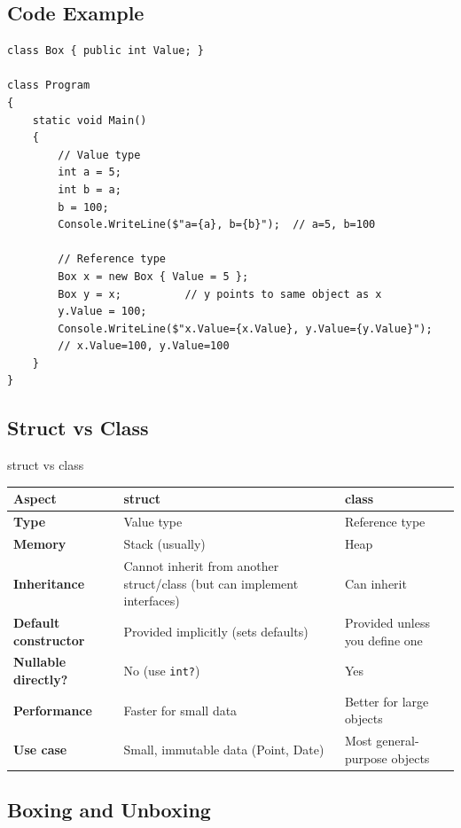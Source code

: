 \documentclass[11pt,a4paper]{article}
\newcommand{\rowcolortop}{\rowcolor{tableHead}\color{white}\bfseries}
\newcommand{\rowcolorlight}{\rowcolor{tableAlt}}
\begin{document}
\subsection{Code Example}

\begin{lstlisting}[caption={Value vs Reference behavior}]
class Box { public int Value; }

class Program
{
    static void Main()
    {
        // Value type
        int a = 5;
        int b = a;
        b = 100;
        Console.WriteLine($"a={a}, b={b}");  // a=5, b=100

        // Reference type
        Box x = new Box { Value = 5 };
        Box y = x;          // y points to same object as x
        y.Value = 100;
        Console.WriteLine($"x.Value={x.Value}, y.Value={y.Value}");
        // x.Value=100, y.Value=100
    }
}
\end{lstlisting}

\subsection{Struct vs Class}

\begin{compareBox}{struct vs class}
\begin{tabularx}{\linewidth}{|>{\bfseries}p{3.5cm}|X|X|}
\hline
\rowcolortop \color{white}Aspect & \color{white}struct & \color{white}class \\
\hline
Type       & Value type & Reference type \\
\rowcolorlight
Memory     & Stack (usually) & Heap \\
Inheritance & Cannot inherit from another struct/class (but can implement interfaces) & Can inherit \\
\rowcolorlight
Default constructor & Provided implicitly (sets defaults) & Provided unless you define one \\
Nullable directly? & No (use \texttt{int?}) & Yes \\
\rowcolorlight
Performance & Faster for small data & Better for large objects \\
Use case & Small, immutable data (Point, Date) & Most general-purpose objects \\
\hline
\end{tabularx}
\end{compareBox}

\subsection{Boxing and Unboxing}
\end{document}
